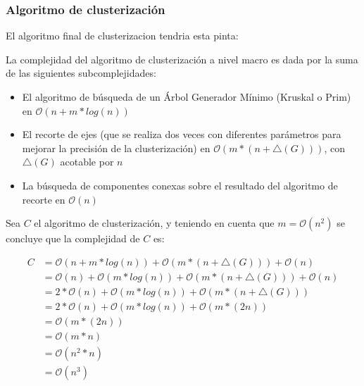 \subsubsection{Algoritmo de clusterización}

El algoritmo final de clusterizacion tendria esta pinta:



La complejidad del algoritmo de clusterización a nivel macro es dada por la suma de las siguientes subcomplejidades:
\begin{itemize}
	\item El algoritmo de búsqueda de un Árbol Generador Mínimo (Kruskal o Prim) en $\mathcal{O}(n + m*log(n))$
	\item El recorte de ejes (que se realiza dos veces con diferentes parámetros para mejorar la precisión de la clusterización) en $\mathcal{O}(m*(n + \triangle(G)))$, con $\triangle(G)$ acotable por $n$
	\item La búsqueda de componentes conexas sobre el resultado del algoritmo de recorte en $\mathcal{O}(n)$
\end{itemize}

Sea $C$ el algoritmo de clusterización, y teniendo en cuenta que $m = \mathcal{O}(n^2)$  se concluye que la complejidad de $C$ es:

\begin{align}
C  &= \mathcal{O}(n + m*log(n)) + \mathcal{O}(m*(n + \triangle(G))) + \mathcal{O}(n) \\
   &= \mathcal{O}(n) + \mathcal{O}(m*log(n)) + \mathcal{O}(m*(n + \triangle(G))) + \mathcal{O}(n) \\
   &= 2*\mathcal{O}(n) + \mathcal{O}(m*log(n)) + \mathcal{O}(m*(n + \triangle(G))) \\
   &= 2*\mathcal{O}(n) + \mathcal{O}(m*log(n)) + \mathcal{O}(m*(2n)) \\
   &= \mathcal{O}(m*(2n)) \\
   &= \mathcal{O}(m*n) \\
   &= \mathcal{O}(n^2*n) \\
   &= \mathcal{O}(n^3) \\
\end{align}
